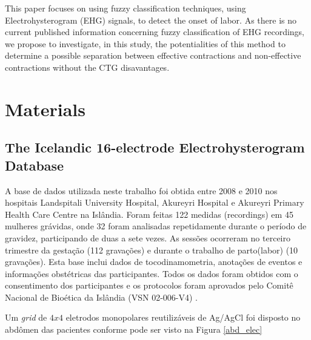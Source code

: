 \documentclass[bioengineering,article,submit,moreauthors,pdftex,10pt,a4paper]{mdpi}
\begin{document}
 This paper focuses on using fuzzy classification techniques, using Electrohysterogram (EHG) signals, to detect the onset of labor. As there is no current
 published information concerning fuzzy classification of EHG recordings, we propose to investigate, in this study, the potentialities of this method to determine a possible separation between effective
 contractions and non-effective contractions without the CTG disavantages.
 





\section{Materials}

\subsection{The Icelandic 16-electrode	Electrohysterogram Database}



A base de dados utilizada neste trabalho foi obtida entre 2008 e 2010 nos hospitais Landspitali University Hospital, Akureyri
Hospital e Akureyri Primary Health Care Centre na Islândia. Foram feitas 122 medidas (recordings) em 45 mulheres grávidas, onde 32 foram analisadas repetidamente durante o período de gravidez, participando de duas a sete vezes. As sessões ocorreram no terceiro trimestre da gestação (112 gravações) e durante o trabalho de parto(labor) (10 gravações).  Esta base inclui dados de tocodinamometria, anotações de eventos e informações obstétricas das participantes. Todos os dados foram obtidos com o consentimento dos participantes e os protocolos foram aprovados pelo Comitê Nacional de Bioética da Islândia (VSN 02-006-V4) \cite{ref-islddatabase}.

Um {\em grid} de $4x4$ eletrodos monopolares reutilizáveis de Ag/AgCl foi disposto no abdômen das pacientes conforme pode ser visto na Figura \ref{abd_elec} 
\end{document}

